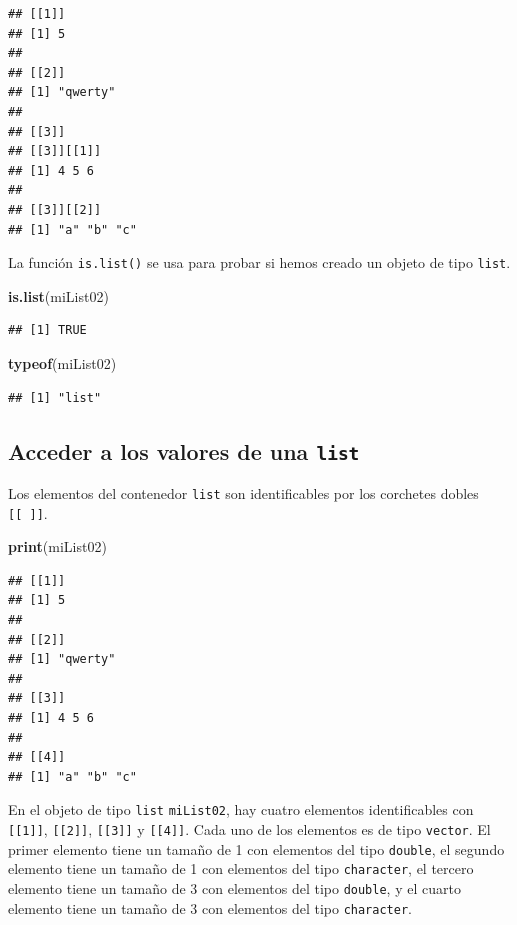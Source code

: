 \documentclass[
]{book}
\newenvironment{Shaded}{\begin{snugshade}}{\end{snugshade}}
\newcommand{\KeywordTok}[1]{\textcolor[rgb]{0.13,0.29,0.53}{\textbf{#1}}}
\newcommand{\NormalTok}[1]{#1}
\begin{document}
\begin{verbatim}
## [[1]]
## [1] 5
## 
## [[2]]
## [1] "qwerty"
## 
## [[3]]
## [[3]][[1]]
## [1] 4 5 6
## 
## [[3]][[2]]
## [1] "a" "b" "c"
\end{verbatim}

La función \texttt{is.list()} se usa para probar si hemos creado un objeto de tipo \texttt{list}.

\begin{Shaded}
\begin{Highlighting}[]
\KeywordTok{is.list}\NormalTok{(miList02)}
\end{Highlighting}
\end{Shaded}

\begin{verbatim}
## [1] TRUE
\end{verbatim}

\begin{Shaded}
\begin{Highlighting}[]
\KeywordTok{typeof}\NormalTok{(miList02)}
\end{Highlighting}
\end{Shaded}

\begin{verbatim}
## [1] "list"
\end{verbatim}

\hypertarget{acceder-a-los-valores-de-una-list}{%
\subsection{\texorpdfstring{Acceder a los valores de una \texttt{list}}{Acceder a los valores de una list}}\label{acceder-a-los-valores-de-una-list}}

Los elementos del contenedor \texttt{list} son identificables por los corchetes dobles \texttt{{[}{[}\ {]}{]}}.

\begin{Shaded}
\begin{Highlighting}[]
\KeywordTok{print}\NormalTok{(miList02)}
\end{Highlighting}
\end{Shaded}

\begin{verbatim}
## [[1]]
## [1] 5
## 
## [[2]]
## [1] "qwerty"
## 
## [[3]]
## [1] 4 5 6
## 
## [[4]]
## [1] "a" "b" "c"
\end{verbatim}

En el objeto de tipo \texttt{list} \texttt{miList02}, hay cuatro elementos identificables con \texttt{{[}{[}1{]}{]}}, \texttt{{[}{[}2{]}{]}}, \texttt{{[}{[}3{]}{]}} y \texttt{{[}{[}4{]}{]}}. Cada uno de los elementos es de tipo \texttt{vector}. El primer elemento tiene un tamaño de 1 con elementos del tipo \texttt{double}, el segundo elemento tiene un tamaño de 1 con elementos del tipo \texttt{character}, el tercero elemento tiene un tamaño de 3 con elementos del tipo \texttt{double}, y el cuarto elemento tiene un tamaño de 3 con elementos del tipo \texttt{character}.
\end{document}
